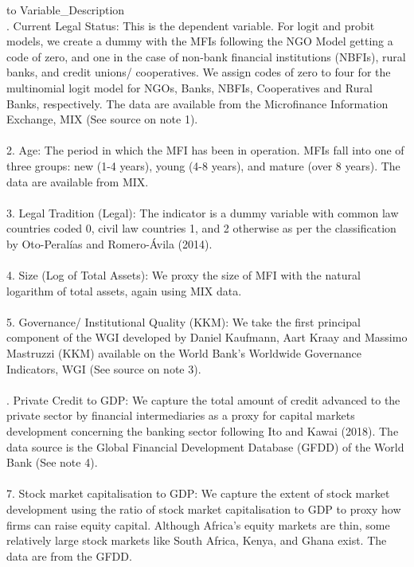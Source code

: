\documentclass[a4paper, nobind]{templates/ociamthesis}
\begin{document}
\begin{table}

\caption{\label{tab:unnamed-chunk-141}Description of Variables}
\centering
\fontsize{9}{11}\selectfont
\begin{tabu} to 
\toprule
Variable\_Description\\
. Current Legal Status: This is the dependent variable. For logit and probit models, we create a dummy with the MFIs following the NGO Model getting a code of zero, and one in the case of non-bank financial institutions (NBFIs), rural banks, and credit unions/ cooperatives. We assign codes of zero to four for the multinomial logit model for NGOs, Banks, NBFIs, Cooperatives and Rural Banks, respectively. The data are available from the Microfinance Information Exchange, MIX (See source on note 1).\\
\\
2.  Age: The period in which the MFI has been in operation. MFIs fall into one of three groups: new (1-4 years), young (4-8 years), and mature (over 8 years). The data are available from MIX.\\
\\
3. Legal Tradition (Legal): The indicator is a dummy variable with common law countries coded 0, civil law countries 1, and 2 otherwise as per the classification by Oto-Peralías and Romero-Ávila (2014).\\
\addlinespace
\\
4. Size (Log of Total Assets): We proxy the size of MFI with the natural logarithm of total assets, again using MIX data.\\
\\
5. Governance/ Institutional Quality (KKM): We take the first principal component of the WGI developed by Daniel Kaufmann, Aart Kraay and Massimo Mastruzzi (KKM) available on the World Bank's Worldwide Governance Indicators, WGI (See source on note 3).\\
\\
. Private Credit to GDP: We capture the total amount of credit advanced to the private sector by financial intermediaries as a proxy for capital markets development concerning the banking sector following Ito and Kawai (2018). The data source is the Global Financial Development Database (GFDD) of the World Bank (See note 4).\\
\\
7. Stock market capitalisation to GDP: We capture the  extent of stock market development using the ratio of stock market capitalisation to GDP to proxy how firms can raise equity capital. Although Africa's equity markets are thin, some relatively large stock markets like South Africa, Kenya, and Ghana exist. The data are from the GFDD.\\

\end{tabu}
\end{table}
\end{document}
